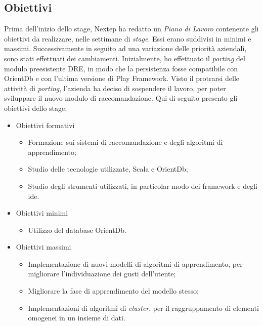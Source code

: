 \subsection{Obiettivi}
Prima dell'inizio dello stage, Nextep ha redatto un \emph{Piano di Lavoro} contenente gli obiettivi da realizzare, nelle settimane di \emph{stage}. Essi erano suddivisi in minimi e massimi. Successivamente in seguito ad una variazione delle priorità aziendali, sono stati effettuati dei cambiamenti. Inizialmente, ho effettuato il \emph{porting} del modulo preesistente DRE, in modo che la persistenza fosse compatibile con OrientDb e con l'ultima versione di Play Framework. Visto il protrarsi delle attività di \emph{porting}, l'azienda ha deciso di sospendere il lavoro, per poter sviluppare il nuovo modulo di raccomandazione.
\newpage
Qui di seguito presento gli obiettivi dello stage:
\begin{itemize}
\item Obiettivi formativi
\begin{itemize}
\item Formazione sui sistemi di raccomandazione e degli algoritmi di apprendimento;
\item Studio delle tecnologie utilizzate, Scala e OrientDb;
\item Studio degli strumenti utilizzati, in particolar modo dei \gls{framework} e degli \gls{ide}.
\end{itemize}
\item Obiettivi minimi
\begin{itemize}
\item Utilizzo del database OrientDb.
\end{itemize}
\item Obiettivi massimi
\begin{itemize}
\item Implementazione di nuovi modelli di algoritmi di apprendimento, per migliorare l'individuazione dei gusti dell'utente;
\item Migliorare la fase di apprendimento del modello stesso;
\item Implementazioni di algoritmi di \emph{cluster}, per il raggruppamento di elementi omogenei in un insieme di dati.
\end{itemize}
\end{itemize}




